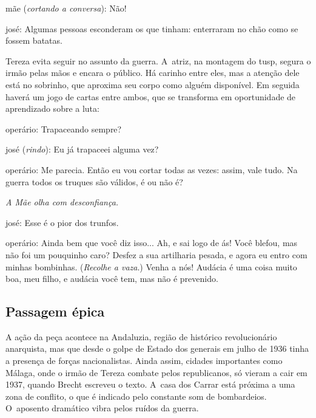 {{\sc mãe} ({\it cortando a conversa}): Não!

{\sc josé}: Algumas pessoas esconderam os que tinham: enterraram no chão como
se fossem batatas.
\stopblockquote

Tereza evita seguir no assunto da guerra. A~atriz, na montagem do {\sc tusp},
segura o irmão pelas mãos e encara o público. Há carinho entre eles, mas
a atenção dele está no sobrinho, que aproxima seu corpo como alguém
disponível. Em seguida haverá um jogo de cartas entre ambos, que se
transforma em oportunidade de aprendizado sobre a luta:

\startblockquote
{\sc operário}: Trapaceando sempre?

{\sc josé} ({\it rindo}): Eu já trapaceei alguma vez?

{\sc operário}: Me parecia. Então eu vou cortar todas as vezes: assim, vale
tudo. Na guerra todos os truques são válidos, é ou não é?

{\it A Mãe olha com desconfiança.}

{\sc josé}: Esse é o pior dos trunfos.

{\sc operário}: Ainda bem que você diz isso... Ah, e sai logo de ás! Você
blefou, mas não foi um pouquinho caro? Desfez a sua artilharia pesada, e
agora eu entro com minhas bombinhas. ({\it Recolhe a vaza}.) Venha a
nós! Audácia é uma coisa muito boa, meu filho, e audácia você tem, mas
não é prevenido.
\stopblockquote


\subsection{Passagem épica}

A ação da peça acontece na Andaluzia, região de histórico revolucionário
anarquista, mas que desde o golpe de Estado dos generais em julho de
1936 tinha a presença de forças nacionalistas. Ainda assim, cidades
importantes como Málaga, onde o irmão de Tereza combate pelos
republicanos, só vieram a cair em 1937, quando Brecht escreveu o
texto. A~casa dos Carrar está próxima a uma zona de conflito, o que é
indicado pelo constante som de bombardeios. O~aposento dramático vibra
pelos ruídos da guerra.

}
